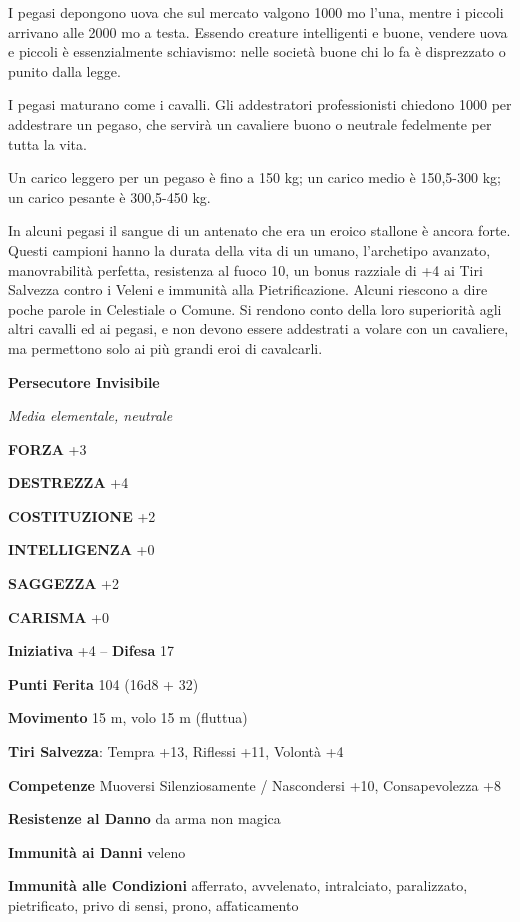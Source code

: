 \begin{multicols}{2}
	I pegasi depongono uova che sul mercato valgono 1000 mo l'una, mentre i piccoli arrivano alle 2000 mo a testa. Essendo creature intelligenti e buone, vendere uova e piccoli è essenzialmente schiavismo: nelle società buone chi lo fa è disprezzato o punito dalla legge.

	I pegasi maturano come i cavalli. Gli addestratori professionisti chiedono 1000 per addestrare un pegaso, che servirà un cavaliere buono o neutrale fedelmente per tutta la vita.

	Un carico leggero per un pegaso è fino a 150 kg; un carico medio è 150,5-300 kg; un carico pesante è 300,5-450 kg.

	In alcuni pegasi il sangue di un antenato che era un eroico stallone è ancora forte. Questi campioni hanno la durata della vita di un umano, l'archetipo avanzato, manovrabilità perfetta, resistenza al fuoco 10, un bonus razziale di +4 ai Tiri Salvezza contro i Veleni e immunità alla Pietrificazione. Alcuni riescono a dire poche parole in Celestiale o Comune. Si rendono conto della loro superiorità agli altri cavalli ed ai pegasi, e non devono essere addestrati a volare con un cavaliere, ma permettono solo ai più grandi eroi di cavalcarli.


	\medskip{}\textbf{Persecutore Invisibile}

	\textit{Media elementale, neutrale}

	\textbf{FORZA} +3

	\textbf{DESTREZZA} +4

	\textbf{COSTITUZIONE} +2

	\textbf{INTELLIGENZA} +0

	\textbf{SAGGEZZA} +2

	\textbf{CARISMA} +0

	\textbf{Iniziativa} +4 -- \textbf{Difesa} 17

	\textbf{Punti Ferita} 104 (16d8 + 32)

	\textbf{Movimento} 15 m, volo 15 m (fluttua)

	\textbf{Tiri Salvezza}: Tempra +13, Riflessi +11, Volontà +4

	\textbf{Competenze} Muoversi Silenziosamente / Nascondersi +10, Consapevolezza +8

	\textbf{Resistenze al Danno} da arma non magica

	\textbf{Immunità ai Danni} veleno

	\textbf{Immunità alle Condizioni} afferrato, avvelenato, intralciato, paralizzato, pietrificato, privo di sensi, prono, affaticamento


\end{multicols}
